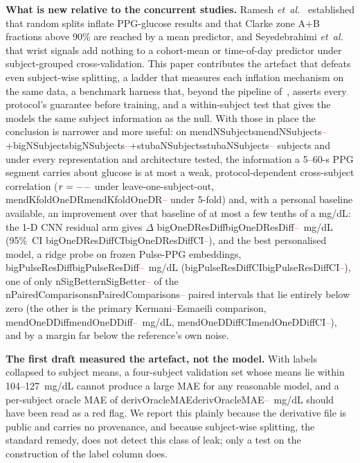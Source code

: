 \documentclass[journal]{IEEEtran}
\newcommand{\m}[1]{\ifcsname #1\endcsname\csname #1\endcsname\else\textcolor{red}{--}\fi}
\begin{document}
\textbf{What is new relative to the concurrent studies.}  Ramesh
\emph{et~al.}~\cite{ramesh2026} established that random splits inflate
PPG-glucose results and that Clarke zone A+B fractions above 90\% are
reached by a mean predictor, and Seyedebrahimi
\emph{et~al.}~\cite{seyedebrahimi2026} that wrist signals add nothing to a
cohort-mean or time-of-day predictor under subject-grouped cross-validation.
This paper contributes the artefact that defeats even subject-wise
splitting, a ladder that measures each inflation mechanism on the same data,
a benchmark harness that, beyond the pipeline of~\cite{ramesh2026}, asserts
every protocol's guarantee before training, and a
within-subject test that gives the models the same subject information as
the null.  With those in place the conclusion is narrower and more useful:
on \m{mendNSubjects}+\m{bigNSubjects}+\m{stubaNSubjects} subjects and under
every representation and architecture tested, the information a
5--60-s PPG segment carries about glucose is at most a weak, protocol-dependent
cross-subject correlation ($r=\m{mendOneDR}$ under leave-one-subject-out,
\m{mendKfoldOneDR} under 5-fold) and, with a personal baseline available, an
improvement over that baseline of at most a few tenths of a mg/dL: the
1-D CNN residual arm gives $\Delta$ \m{bigOneDResDiff}~mg/dL (95\%~CI
\m{bigOneDResDiffCI}), and the best personalised model, a ridge probe on
frozen Pulse-PPG embeddings, \m{bigPulseResDiff}~mg/dL (\m{bigPulseResDiffCI}),
one of only \m{nSigBetter} of the \m{nPairedComparisons} paired intervals that
lie entirely below zero (the other is the primary Kermani--Esmaeili
comparison, \m{mendOneDDiff}~mg/dL, \m{mendOneDDiffCI}), and by a margin far
below the reference's own noise.

\textbf{The first draft measured the artefact, not the model.}  With labels
collapsed to subject means, a four-subject validation set whose means lie
within 104--127~mg/dL cannot produce a large MAE for any reasonable model,
and a per-subject oracle MAE of \m{derivOracleMAE}~mg/dL should have been
read as a red flag.  We report this plainly because the derivative file is public and
carries no provenance, and because subject-wise splitting, the standard
remedy, does
not detect this class of leak; only a test on the construction of the label
column does.
\end{document}
